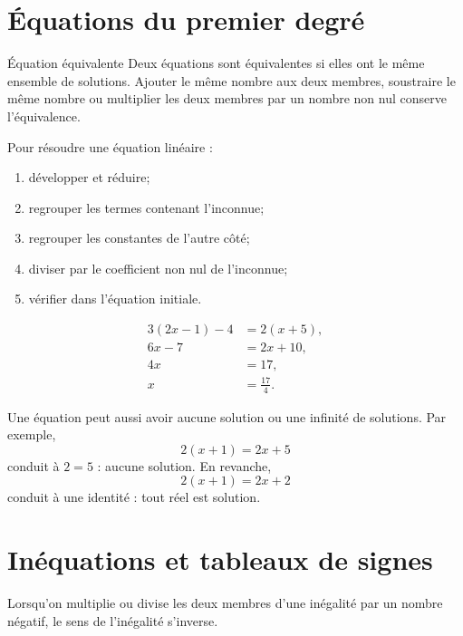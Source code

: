 \section{Équations du premier degré}
\label{manual:section:02.03}

\begin{definition}{Équation équivalente}{}
Deux équations sont équivalentes si elles ont le même ensemble de solutions. Ajouter le même nombre aux deux membres, soustraire le même nombre ou multiplier les deux membres par un nombre non nul conserve l'équivalence.
\end{definition}

\begin{methodbox}
Pour résoudre une équation linéaire :
\begin{enumerate}
\item développer et réduire;
\item regrouper les termes contenant l'inconnue;
\item regrouper les constantes de l'autre côté;
\item diviser par le coefficient non nul de l'inconnue;
\item vérifier dans l'équation initiale.
\end{enumerate}
\end{methodbox}

\begin{examplebox}
\begin{align*}
3(2x-1)-4&=2(x+5),\\
6x-7&=2x+10,\\
4x&=17,\\
x&=\frac{17}{4}.
\end{align*}
\end{examplebox}

Une équation peut aussi avoir aucune solution ou une infinité de solutions. Par exemple,
\[
2(x+1)=2x+5
\]
conduit à $2=5$ : aucune solution. En revanche,
\[
2(x+1)=2x+2
\]
conduit à une identité : tout réel est solution.

\section{Inéquations et tableaux de signes}
\label{manual:section:02.04}

\begin{warningbox}
Lorsqu'on multiplie ou divise les deux membres d'une inégalité par un nombre négatif, le sens de l'inégalité s'inverse.
\end{warningbox}

